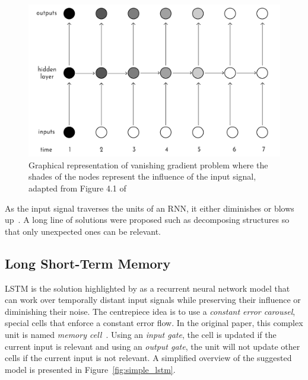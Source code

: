 \begin{figure}[htbp]
    \centering
    \includegraphics[page=1,width=\textwidth]{Figures/outputs_hiddenlayer.pdf}
    \caption{Graphical representation of vanishing gradient problem where the shades of the nodes represent the influence of the input signal, adapted from Figure 4.1 of \textcite{graves_long_2012}}%
    \label{fig:vanishing_gradients}
\end{figure}


As the input signal traverses the units of an RNN, it either diminishes or blows up~\cite{graves_long_2012}.
A long line of solutions were proposed such as decomposing structures so that only unexpected ones can be relevant.

\subsection{Long Short-Term Memory}%
\label{sub:lstm}

LSTM is the solution highlighted by \textcite{graves_long_2012} as a recurrent neural network model that can work over temporally distant input signals while preserving their influence or diminishing their noise.
The centrepiece idea is to use a \emph{constant error carousel}, special cells that enforce a constant error flow.
In the original paper, this complex unit is named \emph{memory cell}~\cite{hochreiter_long_1997}.
Using an \emph{input gate}, the cell is updated if the current input is relevant and using an \emph{output gate}, the unit will not update other cells if the current input is not relevant.
A simplified overview of the suggested model is presented in Figure~\ref{fig:simple_lstm}.

